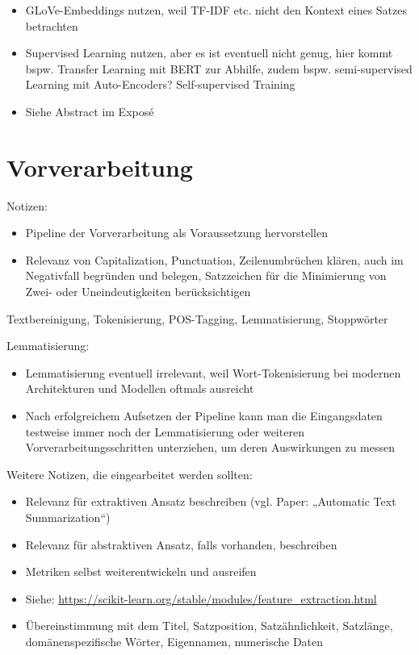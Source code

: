 \begin{itemize}
	\item GLoVe-Embeddings nutzen, weil TF-IDF etc. nicht den Kontext eines Satzes betrachten
	\item Supervised Learning nutzen, aber es ist eventuell nicht genug, hier kommt bspw. Transfer Learning mit BERT zur Abhilfe, zudem bspw. semi-supervised Learning mit Auto-Encoders? Self-supervised Training
	\item Siehe Abstract im Exposé
\end{itemize}


\section{Vorverarbeitung}
Notizen:
\begin{itemize}
	\item Pipeline der Vorverarbeitung als Voraussetzung hervorstellen
	\item Relevanz von Capitalization, Punctuation, Zeilenumbrüchen klären, auch im Negativfall begründen und belegen, Satzzeichen für die Minimierung von Zwei- oder Uneindeutigkeiten berücksichtigen
\end{itemize}


Textbereinigung, Tokenisierung, POS-Tagging, Lemmatisierung, Stoppwörter

Lemmatisierung:
\begin{itemize}
	\item Lemmatisierung eventuell irrelevant, weil Wort-Tokenisierung bei modernen Architekturen und Modellen oftmals ausreicht
	\item Nach erfolgreichem Aufsetzen der Pipeline kann man die Eingangsdaten testweise immer noch der Lemmatisierung oder weiteren Vorverarbeitungsschritten unterziehen, um deren Auswirkungen zu messen
\end{itemize}

Weitere Notizen, die eingearbeitet werden sollten:
\begin{itemize}
	\item Relevanz für extraktiven Ansatz beschreiben (vgl. Paper: „Automatic Text Summarization“)
	\item Relevanz für abstraktiven Ansatz, falls vorhanden, beschreiben
	\item Metriken selbst weiterentwickeln und ausreifen
	\item Siehe: \url{https://scikit-learn.org/stable/modules/feature_extraction.html}
	\item Übereinstimmung mit dem Titel, Satzposition, Satzähnlichkeit, Satzlänge, domänenspezifische Wörter, Eigennamen, numerische Daten
\end{itemize}


